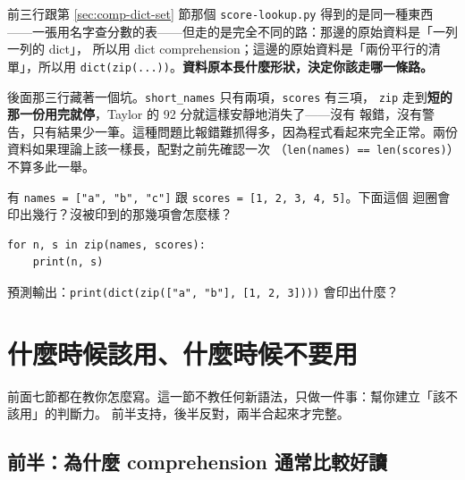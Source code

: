 
前三行跟第 \ref{sec:comp-dict-set} 節那個 \texttt{score-lookup.py} 得到的是同一種東西
——一張用名字查分數的表——但走的是完全不同的路：那邊的原始資料是「一列一列的 dict」，
所以用 dict comprehension；這邊的原始資料是「兩份平行的清單」，所以用
\texttt{dict(zip(...))}。\textbf{資料原本長什麼形狀，決定你該走哪一條路。}

後面那三行藏著一個坑。\texttt{short\_names} 只有兩項，\texttt{scores} 有三項，
\texttt{zip} 走到\textbf{短的那一份用完就停}，Taylor 的 92 分就這樣安靜地消失了——沒有
報錯，沒有警告，只有結果少一筆。這種問題比報錯難抓得多，因為程式看起來完全正常。兩份
資料如果理論上該一樣長，配對之前先確認一次
（\texttt{len(names) == len(scores)}）不算多此一舉。


\begin{drills}[label=drills:zip-walk]
\item 有 \texttt{names = ["a", "b", "c"]} 跟 \texttt{scores = [1, 2, 3, 4, 5]}。下面這個
迴圈會印出幾行？沒被印到的那幾項會怎麼樣？
\begin{verbatim}
for n, s in zip(names, scores):
    print(n, s)
\end{verbatim}
\item 預測輸出：\texttt{print(dict(zip(["a", "b"], [1, 2, 3])))} 會印出什麼？
\end{drills}

\section{什麼時候該用、什麼時候不要用}
\label{sec:comp-limits}

前面七節都在教你怎麼寫。這一節不教任何新語法，只做一件事：幫你建立「該不該用」的判斷力。
前半支持，後半反對，兩半合起來才完整。

\subsection*{前半：為什麼 comprehension 通常比較好讀}

